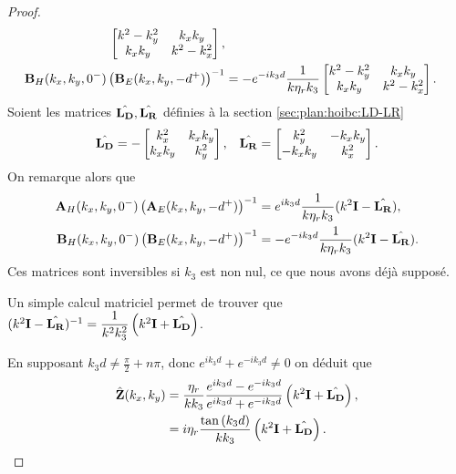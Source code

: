 \begin{proof}
\begin{align*}
\begin{bmatrix}
                    k^2 - k_y^2 & k_x k_y
                    \\
                    k_x k _y & k^2 - k_x^2
                \end{bmatrix},
                \\
                \mathbf{B}_H(k_x,k_y,0^-)\left(\mathbf{B}_E(k_x,k_y,-d^+)\right)^{-1} &= -e^{-ik_3d}\dfrac{1}{k\eta_r k_3}
                    \begin{bmatrix}
                    k^2 - k_y^2 & k_x k_y
                    \\
                    k_x k _y & k^2 - k_x^2
                \end{bmatrix}.
            \end{align*}
            Soient les matrices \(\hat{\mathbf{L_D}},\hat{\mathbf{L_R}}\) définies à la section \ref{sec:plan:hoibc:LD-LR}
            \begin{align*}
                \hat{\mathbf{L_D}} = -\begin{bmatrix}
                k_x^2 & k_x k_y
                \\
                k_x k _y & k_y^2
                \end{bmatrix},
                & & 
                \hat{\mathbf{L_R}} = \begin{bmatrix}
                k_y^2 & -k_x k_y
                \\
                -k_x k _y &  k_x^2
                \end{bmatrix}.
            \end{align*}
            On remarque alors que 
            \begin{align*}
                \mathbf{A}_H(k_x,k_y,0^-)\left(\mathbf{A}_E(k_x,k_y,-d^+)\right)^{-1} &=  e^{ik_3d}\dfrac{1}{k\eta_r k_3}(k^2\mathbf{I}  -\hat{\mathbf{L_R}}),
                \\
                \mathbf{B}_H(k_x,k_y,0^-)\left(\mathbf{B}_E(k_x,k_y,-d^+)\right)^{-1} &= -e^{-ik_3d}\dfrac{1}{k\eta_r k_3}(k^2\mathbf{I}  -\hat{\mathbf{L_R}}).
            \end{align*}
            Ces matrices sont inversibles si \(k_3\) est non nul, ce que nous avons déjà supposé.

            Un simple calcul matriciel permet de trouver que \( (k^2\mathbf{I} - \hat{\mathbf{L_R}})^{-1} = \dfrac{1}{k^2k_3^2}\left(k^2 \mathbf{I} + \hat{\mathbf{L_D}}\right) \).

            En supposant \(k_3d \not = \frac{\pi}{2} + n\pi\), donc \(e^{ik_3d}+e^{-ik_3d}\not=0\) on déduit que
            \begin{align*}
                \hat {\mathbf{Z}}(k_x,k_y) &= \dfrac{\eta_r}{k k_3} \dfrac{e^{ik_3d} - e^{-ik_3d}}{e^{ik_3d} + e^{-ik_3d}}\left(k^2\mathbf{I} + \hat{\mathbf{L_D}}\right),
                \\
                &= i\eta_r\dfrac{\tan\left(k_3d\right)}{k k_3}\left(k^2\mathbf{I} + \hat{\mathbf{L_D}}\right).
            \end{align*}
        \end{proof}

